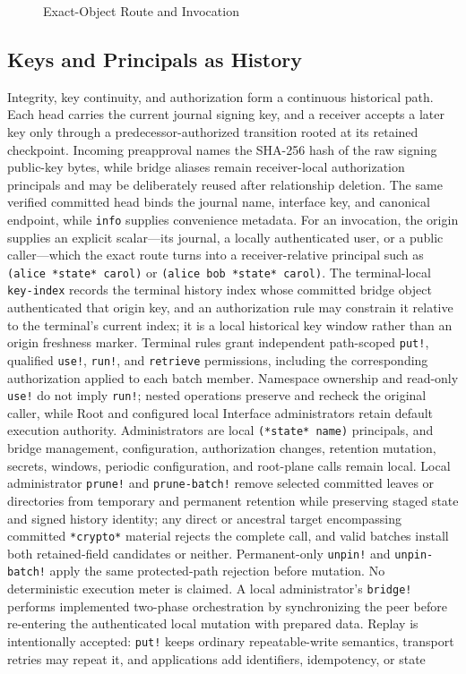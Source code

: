 \begin{figure}[htbp]
  \centering
  \resizebox{0.98\textwidth}{!}{}
  \caption{Exact-Object Route and Invocation}
  \label{fig:federated-invocation}
\end{figure}

\subsection{Keys and Principals as History}

Integrity, key continuity, and authorization form a continuous historical path. Each head carries the current journal signing key, and a receiver accepts a later key only through a predecessor-authorized transition rooted at its retained checkpoint. Incoming preapproval names the SHA-256 hash of the raw signing public-key bytes, while bridge aliases remain receiver-local authorization principals and may be deliberately reused after relationship deletion. The same verified committed head binds the journal name, interface key, and canonical endpoint, while \texttt{info} supplies convenience metadata. For an invocation, the origin supplies an explicit scalar---its journal, a locally authenticated user, or a public caller---which the exact route turns into a receiver-relative principal such as \texttt{(alice *state* carol)} or \texttt{(alice bob *state* carol)}. The terminal-local \texttt{key-index} records the terminal history index whose committed bridge object authenticated that origin key, and an authorization rule may constrain it relative to the terminal's current index; it is a local historical key window rather than an origin freshness marker. Terminal rules grant independent path-scoped \texttt{put!}, qualified \texttt{use!}, \texttt{run!}, and \texttt{retrieve} permissions, including the corresponding authorization applied to each batch member. Namespace ownership and read-only \texttt{use!} do not imply \texttt{run!}; nested operations preserve and recheck the original caller, while Root and configured local Interface administrators retain default execution authority. Administrators are local \texttt{(*state* name)} principals, and bridge management, configuration, authorization changes, retention mutation, secrets, windows, periodic configuration, and root-plane calls remain local. Local administrator \texttt{prune!} and \texttt{prune-batch!} remove selected committed leaves or directories from temporary and permanent retention while preserving staged state and signed history identity; any direct or ancestral target encompassing committed \texttt{*crypto*} material rejects the complete call, and valid batches install both retained-field candidates or neither. Permanent-only \texttt{unpin!} and \texttt{unpin-batch!} apply the same protected-path rejection before mutation. No deterministic execution meter is claimed. A local administrator's \texttt{bridge!} performs implemented two-phase orchestration by synchronizing the peer before re-entering the authenticated local mutation with prepared data. Replay is intentionally accepted: \texttt{put!} keeps ordinary repeatable-write semantics, transport retries may repeat it, and applications add identifiers, idempotency, or state 